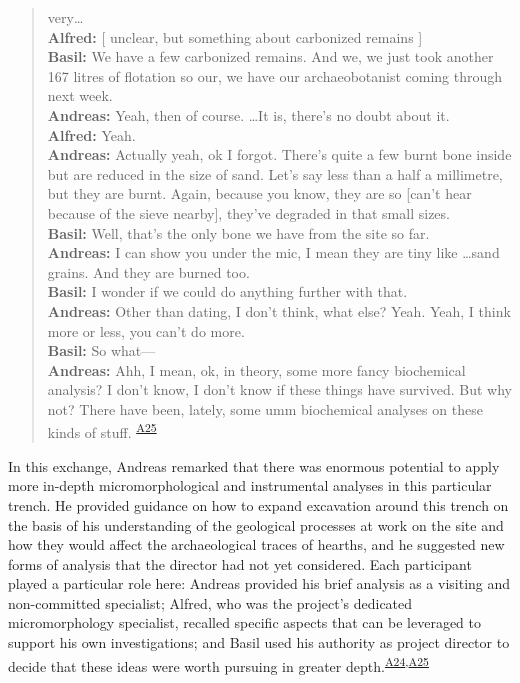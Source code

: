 \documentclass[
  canadian,
]{article}
\begin{document}
\begin{excerpt}
{\begin{quote}
very\ldots{}\\
\textbf{Alfred:} {[} unclear, but something about carbonized remains
{]}\\
\textbf{Basil:} We have a few carbonized remains. And we, we just took
another 167 litres of flotation so our, we have our archaeobotanist
coming through next week.\\
\textbf{Andreas:} Yeah, then of course. \dots It is, there's no doubt
about it.\\
\textbf{Alfred:} Yeah.\\
\textbf{Andreas:} Actually yeah, ok I forgot. There's quite a few burnt
bone inside but are reduced in the size of sand. Let's say less than a
half a millimetre, but they are burnt. Again, because you know, they are
so {[}can't hear because of the sieve nearby{]}, they've degraded in
that small sizes.\\
\textbf{Basil:} Well, that's the only bone we have from the site so
far.\\
\textbf{Andreas:} I can show you under the mic, I mean they are tiny
like \dots sand grains. And they are burned too.\\
\textbf{Basil:} I wonder if we could do anything further with that.\\
\textbf{Andreas:} Other than dating, I don't think, what else? Yeah.
Yeah, I think more or less, you can't do more.\\
\textbf{Basil:} So what---\\
\textbf{Andreas:} Ahh, I mean, ok, in theory, some more fancy
biochemical analysis? I don't know, I don't know if these things have
survived. But why not? There have been, lately, some umm biochemical
analyses on these kinds of stuff.
\textsuperscript{\hyperref[sec-A25]{A25}}
\end{quote}

}

\caption{\label{exc-consulting-dialogue}Andreas provides guidance on how
to collect meaningful information.}

\end{excerpt}%

In this exchange, Andreas remarked that there was enormous potential to
apply more in-depth micromorphological and instrumental analyses in this
particular trench. He provided guidance on how to expand excavation
around this trench on the basis of his understanding of the geological
processes at work on the site and how they would affect the
archaeological traces of hearths, and he suggested new forms of analysis
that the director had not yet considered. Each participant played a
particular role here: Andreas provided his brief analysis as a visiting
and non-committed specialist; Alfred, who was the project's dedicated
micromorphology specialist, recalled specific aspects that can be
leveraged to support his own investigations; and Basil used his
authority as project director to decide that these ideas were worth
pursuing in greater
depth.\textsuperscript{\hyperref[sec-A24]{A24},\hyperref[sec-A25]{A25}}
\end{document}
